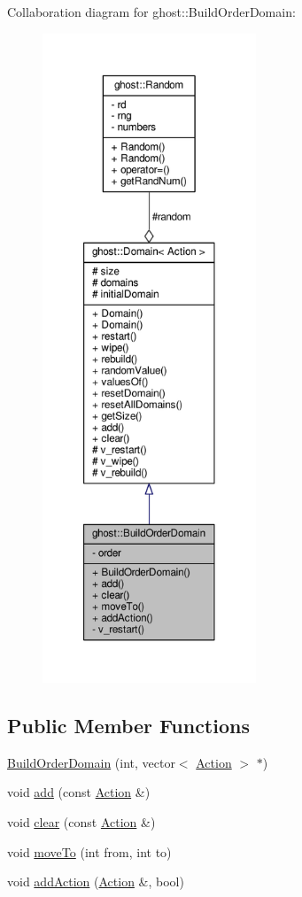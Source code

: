 Collaboration diagram for ghost\-:\-:Build\-Order\-Domain\-:
\nopagebreak
\begin{figure}[H]
\begin{center}
\leavevmode
\includegraphics[height=550pt]{classghost_1_1BuildOrderDomain__coll__graph}
\end{center}
\end{figure}
\subsection*{Public Member Functions}
\begin{DoxyCompactItemize}
\item 
\hyperlink{classghost_1_1BuildOrderDomain_ac09e92262d5c39c75dd0164fb938fabc}{Build\-Order\-Domain} (int, vector$<$ \hyperlink{classghost_1_1Action}{Action} $>$ $\ast$)
\item 
void \hyperlink{classghost_1_1BuildOrderDomain_a7019f574fc926bca2c03c7910f23e165}{add} (const \hyperlink{classghost_1_1Action}{Action} \&)
\item 
void \hyperlink{classghost_1_1BuildOrderDomain_ab18f42adf6e2eddea3142ae8fdc8c951}{clear} (const \hyperlink{classghost_1_1Action}{Action} \&)
\item 
void \hyperlink{classghost_1_1BuildOrderDomain_ad258d2c26e415388b9e42a02ecbadb06}{move\-To} (int from, int to)
\item 
void \hyperlink{classghost_1_1BuildOrderDomain_a9747d6078687ebed2487fad646fd61a8}{add\-Action} (\hyperlink{classghost_1_1Action}{Action} \&, bool)
\end{DoxyCompactItemize}
